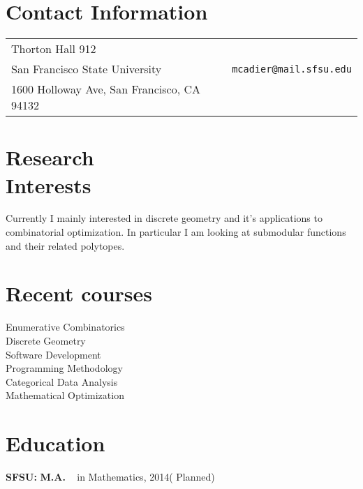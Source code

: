 \documentclass[margin,line,pifont,palatino,courier]{res}
\newenvironment{list1}{
  \begin{list}{\ding{113}}{%
      \setlength{\itemsep}{0in}
      \setlength{\parsep}{0in} \setlength{\parskip}{0in}
      \setlength{\topsep}{0in} \setlength{\partopsep}{0in}
      \setlength{\leftmargin}{0.17in}}}{\end{list}}
\begin{document}

\begin{resume}

\section{\sc  Contact Information}

\vspace{.05in}
\begin{tabular}{@{}p{2.75in}p{2in}}
Thorton Hall 912     &  \\
     San Francisco State University    & \verb+mcadier@mail.sfsu.edu+\\
      1600 Holloway Ave, San Francisco, CA 94132  & \\

\end{tabular}

 
\section{\sc  Research \\ Interests}


Currently I mainly interested in discrete geometry and it's applications to combinatorial optimization.  In particular I am looking at submodular functions and their related polytopes. 


\section{\sc Recent courses}
Enumerative Combinatorics\\
 Discrete Geometry\\
 Software Development\\
 Programming Methodology\\
 Categorical Data Analysis\\
 Mathematical Optimization

 
 \section{\sc Education}



 
\begin{list1}
\item  {\bf SFSU:}  \textbf{M.A.} ~ in Mathematics, 2014( Planned) \\



\end{list1}
\end{resume}
\end{document}
